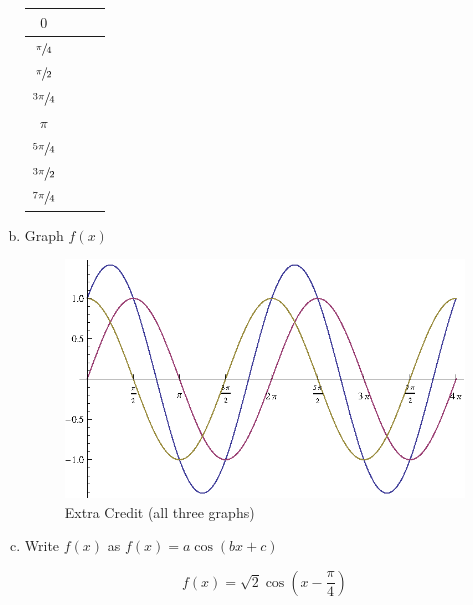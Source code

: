 \documentclass{exam}
\begin{document}
\begin{enumerate}[(a)]
\begin{tabular}[H]{cccc}
          \midrule
          $0$                &          &          & \\
          \midrule
          $\sfrac{\pi}{4}$   &          &          & \\
          \midrule
          $\sfrac{\pi}{2}$   &          &          & \\
          \midrule
          $\sfrac{3 \pi}{4}$ &          &          & \\
          \midrule
          $\pi$              &          &          & \\
          \midrule
          $\sfrac{5 \pi}{4}$ &          &          & \\
          \midrule
          $\sfrac{3 \pi}{2}$ &          &          & \\
          \midrule
          $\sfrac{7 \pi}{4}$ &          &          & \\
          \bottomrule
        \end{tabular}
      \fi

    \item Graph $f(x)$
      \begin{solution}
        
      \begin{figure}[H]
        \centering
        \includegraphics{extraCredit.eps}
        \caption{Extra Credit (all three graphs)}
      \end{figure}
      \end{solution}

    \item Write $f(x)$ as $f(x) = a \cos (bx + c)$
      \begin{solution}
        \[
          f(x) = \sqrt{2} \cos \left( x - \frac{\pi}{4} \right)
        \]
      \end{solution}

  \end{enumerate}
\end{document}
